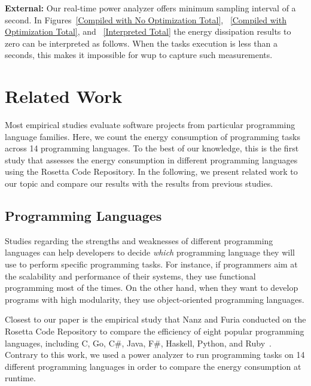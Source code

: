 \noindent\textbf{External:} Our real-time power analyzer offers 
minimum sampling interval of a second. 
In Figures~\ref{Compiled with No Optimization Total}, 
~\ref{Compiled with Optimization Total}, and ~\ref{Interpreted Total}  
the energy dissipation results to zero can be interpreted as follows.
When the tasks execution is less than a seconds, this makes it 
impossible for {\sc wup} to capture such measurements. 


\section{Related Work} \label{related_work}
Most empirical studies evaluate software projects
from particular programming language families.
Here, we count the energy consumption of programming tasks across 
14 programming languages.
To the best of our knowledge, this is the first study that assesses 
the energy consumption in different programming languages using 
the Rosetta Code Repository.
In the following, we present related work to our topic and compare 
our results with the results from previous studies.

\subsection{Programming Languages}
Studies regarding the strengths and weaknesses of different 
programming languages can help developers to decide {\it which} 
programming language they will use to perform specific 
programming tasks.
For instance, if programmers aim at the scalability and performance 
of their systems, they use functional programming most of the 
times.
On the other hand, when they want to develop programs with high 
modularity, they use object-oriented programming languages.

Closest to our paper is the empirical study that Nanz and Furia
conducted on the Rosetta Code Repository to compare the efficiency 
of eight popular programming languages, including C, Go, C\#, Java, 
F\#, Haskell, Python, and  Ruby~\cite{NF15}.
Contrary to this work, we used a power analyzer to run programming 
tasks on 14 different programming languages in order to compare the 
energy consumption at runtime.

